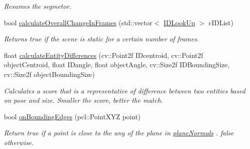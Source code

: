 \begin{DoxyCompactItemize}
\begin{DoxyCompactList}\small\item\em Resumes the segmetor. \end{DoxyCompactList}\item 
\hypertarget{classpersonal_robotics_1_1_object_segmentor_ad318d1a55224a9de468b66ffc477ebc6}{}bool \hyperlink{classpersonal_robotics_1_1_object_segmentor_ad318d1a55224a9de468b66ffc477ebc6}{calculate\+Overall\+Change\+In\+Frames} (std\+::vector$<$ \hyperlink{structpersonal_robotics_1_1_i_d_look_up}{I\+D\+Look\+Up} $>$ c\+I\+D\+List)\label{classpersonal_robotics_1_1_object_segmentor_ad318d1a55224a9de468b66ffc477ebc6}

\begin{DoxyCompactList}\small\item\em Returns true if the scene is static for a certain number of frames. \end{DoxyCompactList}\item 
\hypertarget{classpersonal_robotics_1_1_object_segmentor_a742bab296bfdbba8a449163dc7209180}{}float \hyperlink{classpersonal_robotics_1_1_object_segmentor_a742bab296bfdbba8a449163dc7209180}{calculate\+Entity\+Differences} (cv\+::\+Point2f I\+Dcentroid, cv\+::\+Point2f object\+Centroid, float I\+Dangle, float object\+Angle, cv\+::\+Size2f I\+D\+Bounding\+Size, cv\+::\+Size2f object\+Bounding\+Size)\label{classpersonal_robotics_1_1_object_segmentor_a742bab296bfdbba8a449163dc7209180}

\begin{DoxyCompactList}\small\item\em Calculates a score that is a representative of difference between two entities based on pose and size. Smaller the score, better the match. \end{DoxyCompactList}\item 
\hypertarget{classpersonal_robotics_1_1_object_segmentor_a9b69d4969a53e50bcd6c7e59b9ec2b19}{}bool \hyperlink{classpersonal_robotics_1_1_object_segmentor_a9b69d4969a53e50bcd6c7e59b9ec2b19}{on\+Bounding\+Edges} (pcl\+::\+Point\+X\+Y\+Z point)\label{classpersonal_robotics_1_1_object_segmentor_a9b69d4969a53e50bcd6c7e59b9ec2b19}

\begin{DoxyCompactList}\small\item\em Return true if a point is close to the any of the plane in \hyperlink{classpersonal_robotics_1_1_object_segmentor_a2d9b43c69441221cd4b03b61da1ba1ae}{plane\+Normals} . false otherwise. \end{DoxyCompactList}\end{DoxyCompactItemize}
